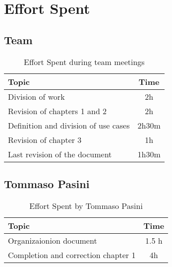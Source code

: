 \chapter{Effort Spent}

\section*{Team}


\begin{table}[H]
    \renewcommand{\arraystretch}{1.5}
    \centering
    \begin{tabular}{|l|c|}
        \hline
        \textbf{Topic}                       & \textbf{Time} \\ \hline
        Division of work                     & 2h            \\ \hline
        Revision of chapters 1 and 2         & 2h            \\ \hline
        Definition and division of use cases & 2h30m         \\ \hline
        Revision of chapter 3                & 1h            \\ \hline
        Last revision of the document        & 1h30m         \\ \hline
    \end{tabular}
    \caption{Effort Spent during team meetings}
    \label{tab:group-effort-spent}
\end{table}

\section*{Tommaso Pasini}
\begin{table}[H]
    \renewcommand{\arraystretch}{1.5}
    \centering
    \begin{tabular}{|l|c|}
        \hline
        \textbf{Topic}                      & \textbf{Time} \\ \hline
        Organizaionion document             & 1.5 h         \\ \hline
        Completion and correction chapter 1 & 4h            \\ \hline
    \end{tabular}
    \caption{Effort Spent by Tommaso Pasini}
    \label{tab:pasini-effort-spent}
\end{table}

